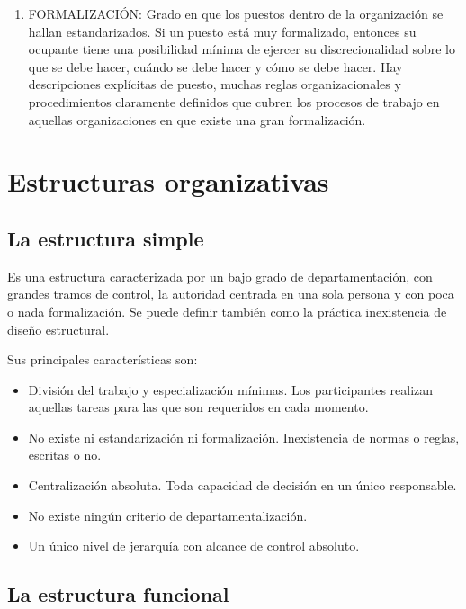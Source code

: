 \documentclass[
]{krantz}
\providecommand{\tightlist}{%
  \setlength{\itemsep}{0pt}\setlength{\parskip}{0pt}}
\begin{document}
\begin{enumerate}
\item
  FORMALIZACIÓN: Grado en que los puestos dentro de la organización se hallan estandarizados. Si un puesto está muy formalizado, entonces su ocupante tiene una posibilidad mínima de ejercer su discrecionalidad sobre lo que se debe hacer, cuándo se debe hacer y cómo se debe hacer. Hay descripciones explícitas de puesto, muchas reglas organizacionales y procedimientos claramente definidos que cubren los procesos de trabajo en aquellas organizaciones en que existe una gran formalización.
\end{enumerate}

\hypertarget{estructuras-organizativas}{%
\section{Estructuras organizativas}\label{estructuras-organizativas}}

\hypertarget{la-estructura-simple}{%
\subsection{La estructura simple}\label{la-estructura-simple}}

Es una estructura caracterizada por un bajo grado de departamentación, con grandes tramos de control, la autoridad centrada en una sola persona y con poca o nada formalización. Se puede definir también como la práctica inexistencia de diseño estructural.

Sus principales características son:

\begin{itemize}
\tightlist
\item
  División del trabajo y especialización mínimas. Los participantes realizan aquellas tareas para las que son requeridos en cada momento.
\item
  No existe ni estandarización ni formalización. Inexistencia de normas o reglas, escritas o no.
\item
  Centralización absoluta. Toda capacidad de decisión en un único responsable.
\item
  No existe ningún criterio de departamentalización.
\item
  Un único nivel de jerarquía con alcance de control absoluto.
\end{itemize}

\hypertarget{la-estructura-funcional}{%
\subsection{La estructura funcional}\label{la-estructura-funcional}}
\end{document}

